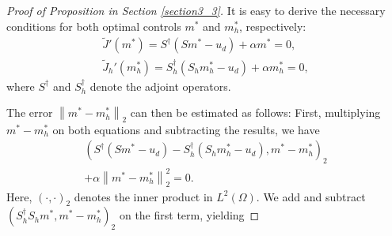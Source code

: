 \documentclass[letterpaper]{article}
\newcommand{\norm}[1]{\left\lVert#1\right\rVert}
\newcommand{\bmm}{m^*}
\newcommand{\bmmh}{m_h^*}
\begin{document}
\begin{proof}[Proof of Proposition in Section \ref{section3_3}]
  It is easy to derive the necessary conditions for both optimal controls $\bmm$ and $\bmmh$, respectively:
\begin{gather*}
    \tilde{J}'(\bmm) = S^\dagger (S\bmm - u_d) + \alpha \bmm = 0,\\
    \tilde{J}_h'(\bmmh) = S_h^\dagger (S_h\bmmh - u_d) + \alpha \bmmh = 0, 
\end{gather*}
where $S^\dagger$ and $S_h^\dagger$ denote the adjoint operators. 

The error $\norm{\bmm - \bmmh}_2$ can then be estimated as follows: First, multiplying $\bmm - \bmmh$ on both equations and subtracting the results, we have
\begin{multline}
  (S^\dagger (S\bmm - u_d) - S_h^\dagger (S_h\bmmh - u_d), \bmm - \bmmh)_2 \\
  + \alpha \norm{\bmm - \bmmh}_2^2 = 0.
\end{multline}
Here, $(\cdot, \cdot)_2$ denotes the inner product in $L^2(\Omega)$. We add and subtract $(S_h^\dagger S_h \bmm, \bmm - \bmmh)_2$ on the first term, yielding 


\end{proof}
\end{document}
